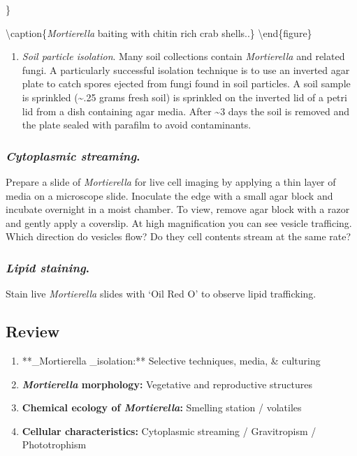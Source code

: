 \documentclass[]{book}
\providecommand{\tightlist}{%
  \setlength{\itemsep}{0pt}\setlength{\parskip}{0pt}}
\begin{document}
\}

\textbackslash caption\{\emph{Mortierella} baiting with chitin rich crab shells..\}\label{fig:ch8fig6}
\textbackslash end\{figure\}

\begin{enumerate}
\def\labelenumi{\arabic{enumi}.}
\setcounter{enumi}{1}
\tightlist
\item
  \emph{Soil particle isolation}. Many soil collections contain \emph{Mortierella} and related fungi. A particularly successful isolation technique is to use an inverted agar plate to catch spores ejected from fungi found in soil particles. A soil sample is sprinkled (\textasciitilde.25 grams fresh soil) is sprinkled on the inverted lid of a petri lid from a dish containing agar media. After \textasciitilde3 days the soil is removed and the plate sealed with parafilm to avoid contaminants.
\end{enumerate}

\hypertarget{cytoplasmic-streaming.}{%
\subsubsection{\texorpdfstring{\emph{Cytoplasmic streaming}.}{Cytoplasmic streaming.}}\label{cytoplasmic-streaming.}}

Prepare a slide of \emph{Mortierella} for live cell imaging by applying a thin layer of media on a microscope slide. Inoculate the edge with a small agar block and incubate overnight in a moist chamber. To view, remove agar block with a razor and gently apply a coverslip. At high magnification you can see vesicle trafficing. Which direction do vesicles flow? Do they cell contents stream at the same rate?

\hypertarget{lipid-staining.}{%
\subsubsection{\texorpdfstring{\emph{Lipid staining}.}{Lipid staining.}}\label{lipid-staining.}}

Stain live \emph{Mortierella} slides with `Oil Red O' to observe lipid trafficking.

\hypertarget{review}{%
\subsection{Review}\label{review}}

\begin{enumerate}
\def\labelenumi{\arabic{enumi}.}
\tightlist
\item
  **\_Mortierella \_isolation:** Selective techniques, media, \& culturing
\item
  \textbf{\emph{Mortierella} morphology:} Vegetative and reproductive structures
\item
  \textbf{Chemical ecology of \emph{Mortierella}:} Smelling station / volatiles
\item
  \textbf{Cellular characteristics:} Cytoplasmic streaming / Gravitropism / Phototrophism
\end{enumerate}
\end{document}
